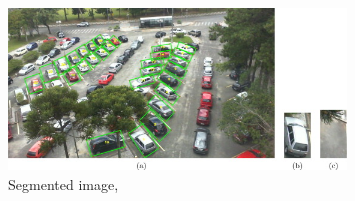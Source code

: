 \documentclass{beamer}
\begin{document}
\begin{frame}[allowframebreaks]
\begin{itemize}
		\begin{figure}[h!]
		\centering
		\includegraphics[width=0.8\textwidth]{Pictures/parking}
		\caption{Segmented image, \cite{deAlmeida}}
	\end{figure}
	
\end{itemize}

\end{frame}
\end{document}
